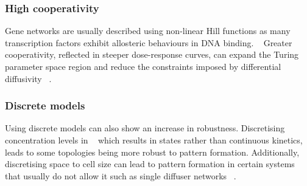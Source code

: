 \subsubsection{High cooperativity}
Gene networks are usually described using non-linear Hill functions as many transcription factors exhibit allosteric behaviours in DNA binding. ~\parencite{Morgunova2017}
Greater cooperativity, reflected in steeper dose-response curves, can expand the Turing parameter space region and reduce the constraints imposed by differential diffusivity ~\parencite{Diambra2015a}.
%
%

\subsubsection{Discrete models}
Using discrete models can also show an increase in robustness.
Discretising concentration levels in ~\cite{Leyshon2021} which results in states rather than continuous kinetics, leads to some topologies being more robust to pattern formation. %
Additionally, discretising space to cell size can lead to pattern formation in certain systems that usually do not allow it such as single diffuser networks ~\parencite{Wang2022}.

